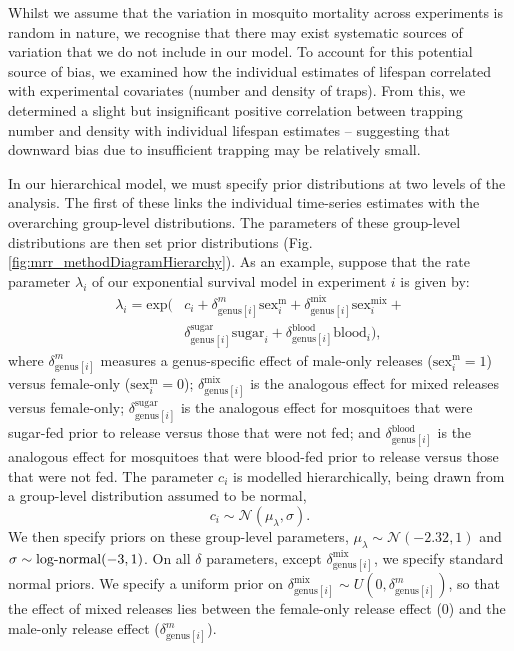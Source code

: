 \documentclass[12pt]{article}
\begin{document}
Whilst we assume that the variation in mosquito mortality across experiments is random in nature, we recognise that there may exist systematic sources of variation that we do not include in our model. To account for this potential source of bias, we examined how the individual estimates of lifespan correlated with experimental covariates (number and density of traps). From this, we determined a slight but insignificant positive correlation between trapping number and density with individual lifespan estimates -- suggesting that downward bias due to insufficient trapping may be relatively small.

In our hierarchical model, we must specify prior distributions at two levels of the analysis. The first of these links the individual time-series estimates with the overarching group-level distributions. The parameters of these group-level distributions are then set prior distributions (Fig. \ref{fig:mrr_methodDiagramHierarchy}). As an example, suppose that the rate parameter $\lambda_i$ of our exponential survival model in experiment $i$ is given by:
%
\begin{align}
\lambda_i = \text{exp}(&c_i + \delta^m_{\text{genus}[i]} \text{sex}^{\text{m}}_i + \delta^{\text{mix}}_{\text{genus}[i]} \text{sex}^{\text{mix}}_i +\\  & \delta^{\text{sugar}}_{\text{genus}[i]} \text{sugar}_i +  \delta^{\text{blood}}_{\text{genus}[i]} \text{blood}_i),
\end{align}
%
where $\delta^m_{\text{genus}[i]}$ measures a genus-specific effect of male-only releases ($\text{sex}^{\text{m}}_i=1$) versus female-only ($\text{sex}^{\text{m}}_i=0$); $\delta^{\text{mix}}_{\text{genus}[i]}$ is the analogous effect for mixed releases versus female-only; $\delta^{\text{sugar}}_{\text{genus}[i]}$ is the analogous effect for mosquitoes that were sugar-fed prior to release versus those that were not fed; and $\delta^{\text{blood}}_{\text{genus}[i]}$ is the analogous effect for mosquitoes that were blood-fed prior to release versus those that were not fed. The parameter $c_i$ is modelled hierarchically, being drawn from a group-level distribution assumed to be normal,
%
\begin{equation}
c_i \sim  \mathcal{N}(\mu_\lambda,\sigma).
\end{equation}
%
We then specify priors on these group-level parameters, $\mu_\lambda \sim \mathcal{N}(-2.32,1)$ and $\sigma \sim \textnormal{log-normal}(-3,1)$. On all $\delta$ parameters, except $\delta^{\text{mix}}_{\text{genus}[i]}$, we specify standard normal priors. We specify a uniform prior on $\delta^{\text{mix}}_{\text{genus}[i]}\sim U(0,\delta^m_{\text{genus}[i]})$, so that the effect of mixed releases lies between the female-only release effect (0) and the male-only release effect ($\delta^m_{\text{genus}[i]}$). 
\end{document}
